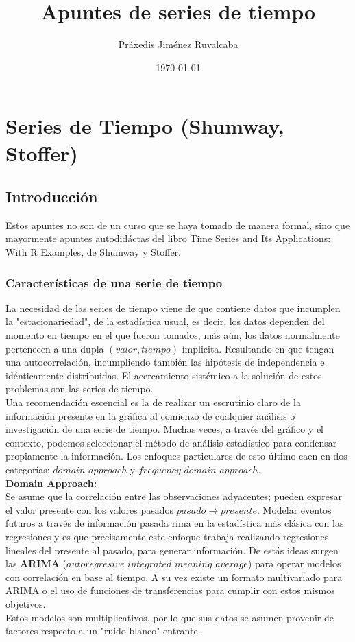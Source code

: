 \documentclass[11pt,a4paper,oneside]{report}
\title{Apuntes de series de tiempo}
\author{Práxedis Jiménez Ruvalcaba}
\date{\today}
\theoremstyle{definition}
\theoremstyle{plain}
\theoremstyle{remark}
\begin{document}
\maketitle
\tableofcontents

\part{Series de Tiempo (Shumway, Stoffer)}

\chapter{Introducción}
Estos apuntes no son de un curso que se haya tomado de manera formal, sino que
mayormente apuntes autodidáctas del libro Time Series and Its Applications: With R Examples, 
de Shumway y Stoffer.

\section{Características de una serie de tiempo}
La necesidad de las series de tiempo viene de que contiene datos que incumplen la
"estacionariedad", de la estadística usual, es decir, los datos dependen del momento en 
tiempo en el que fueron tomados, más aún, los datos normalmente pertenecen a una dupla
$(valor,tiempo)$  ímplicita. Resultando en que tengan una autocorrelación, incumpliendo también las 
hipótesis de independencia e idénticamente distribuidas. El acercamiento sistémico a la
solución de estos problemas son las series de tiempo.\\

Una recomendación escencial es la de realizar un escrutinio claro de la información presente en
la gráfica al comienzo de cualquier análisis o investigación de una serie de tiempo. Muchas veces,
a través del gráfico y el contexto, podemos seleccionar el método de análisis estadístico para 
condensar propiamente la información. Los enfoques particulares de esto último caen en dos categorías:
$domain$ $approach$ y $frequency$ $domain$ $approach$.\\

\textbf{Domain Approach:}\\
Se asume que la correlación entre las observaciones adyacentes; pueden expresar el valor presente con 
los valores pasados $pasado \rightarrow presente$. Modelar eventos futuros a través de información 
pasada rima en la estadística más clásica con las regresiones y es que precisamente este enfoque 
trabaja realizando regresiones lineales del presente al pasado, para generar información. 
De estás ideas surgen las \textbf{ARIMA} ($autoregresive$ $integrated$ $meaning$ $average$) 
para operar modelos con correlación en base al tiempo. A su vez existe un formato multivariado para 
ARIMA o el uso de funciones de transferencias para cumplir con estos mismos objetivos.\\
Estos modelos son multiplicativos, por lo que sus datos se asumen provenir de factores
respecto a un "ruido blanco" entrante.
\end{document}

